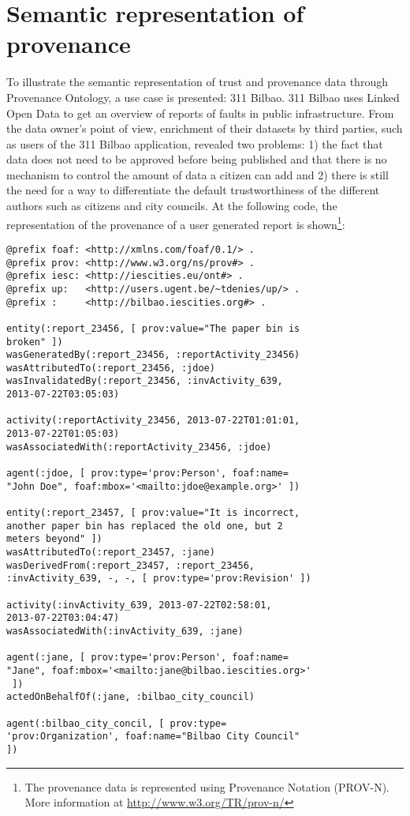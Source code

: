 \section{Semantic representation of provenance}
\label{sec:use_cases}

To illustrate the semantic representation of trust and provenance data through Provenance Ontology, a use case is presented: 311 Bilbao. 311 Bilbao uses Linked Open Data to get an overview of reports of faults in public infrastructure. From the data owner’s point of view, enrichment of their datasets by third parties, such as users of the 311 Bilbao application, revealed two problems: 1) the fact that data does not need to be approved before being published and that there is no mechanism to control the amount of data a citizen can add and 2) there is still the need for a way to differentiate the default trustworthiness of the different authors such as citizens and city councils. At the following code, the representation of the provenance of a user generated report is shown\footnote{The provenance data is represented using Provenance Notation (PROV-N). More information at \url{http://www.w3.org/TR/prov-n/}}:

\lstset{numbers=left, basicstyle=\ttfamily\scriptsize,}
\begin{lstlisting}
@prefix foaf: <http://xmlns.com/foaf/0.1/> .
@prefix prov: <http://www.w3.org/ns/prov#> .
@prefix iesc: <http://iescities.eu/ont#> .
@prefix up:   <http://users.ugent.be/~tdenies/up/> .
@prefix :     <http://bilbao.iescities.org#> .

entity(:report_23456, [ prov:value="The paper bin is
broken" ])
wasGeneratedBy(:report_23456, :reportActivity_23456)
wasAttributedTo(:report_23456, :jdoe)
wasInvalidatedBy(:report_23456, :invActivity_639,
2013-07-22T03:05:03)

activity(:reportActivity_23456, 2013-07-22T01:01:01,
2013-07-22T01:05:03)
wasAssociatedWith(:reportActivity_23456, :jdoe)

agent(:jdoe, [ prov:type='prov:Person', foaf:name=
"John Doe", foaf:mbox='<mailto:jdoe@example.org>' ])

entity(:report_23457, [ prov:value="It is incorrect,
another paper bin has replaced the old one, but 2
meters beyond" ])
wasAttributedTo(:report_23457, :jane)
wasDerivedFrom(:report_23457, :report_23456,
:invActivity_639, -, -, [ prov:type='prov:Revision' ])

activity(:invActivity_639, 2013-07-22T02:58:01,
2013-07-22T03:04:47)
wasAssociatedWith(:invActivity_639, :jane)

agent(:jane, [ prov:type='prov:Person', foaf:name=
"Jane", foaf:mbox='<mailto:jane@bilbao.iescities.org>'
 ])
actedOnBehalfOf(:jane, :bilbao_city_council)

agent(:bilbao_city_concil, [ prov:type=
'prov:Organization', foaf:name="Bilbao City Council"
])

\end{lstlisting}

